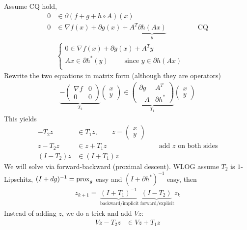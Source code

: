 \documentclass[class=article,crop=false]{standalone}
\begin{document}
Assume CQ hold,
\begin{align*}
	0 &\in \partial (f+g+h \circ A)(x)\\
	0 &\in \nabla f(x)+ \partial g(x) + A^{T} \underbrace{ \partial h(Ax) }_{ y} && \text{ CQ} \\
	  &\begin{cases}
		0 \in \nabla f(x) + \partial g(x) + A^{T}y\\
		Ax \in \partial h^* (y)\qquad  \text{ since } y \in \partial h(Ax) \\
	\end{cases}
\end{align*}
Rewrite the two equations in matrix form (although they are operators)
\begin{align*}
	\underbrace{ - \begin{pmatrix} \nabla f &0\\0&0 \end{pmatrix}}_{T_2} \begin{pmatrix} x\\y \end{pmatrix} \in \underbrace{ \begin{pmatrix} \partial g& A^{T}\\-A& \partial h^*  \end{pmatrix}}_{T_1} \begin{pmatrix} x\\y \end{pmatrix} 
\end{align*}
This yields
\begin{align*}
	- T_2 z &\in T_1 z,\qquad  z = \begin{pmatrix} x\\y \end{pmatrix} \\
	z-T_2 z & \in z+T_1 z &&\text{ add }z \text{ on both sides}  \\
	(I-T_2)z  & \in (I+T_1)z
\end{align*}
We will solve via forward-backward (proximal descent). WLOG assume $ T_2$ is $ 1$-Lipschitz, $ (I + dg)^{-1}=\operatorname{prox}_g$ easy and $ (I + \partial h^* )^{-1}$ easy, then
 \begin{align*}
	 z_{k+1} = \underbrace{ (I + T_1)^{-1} }_{ \text{ backward/implicit} } \underbrace{ (I-T_2) }_{ \text{ forward/explicit} } z_k
\end{align*}
Instead of adding $ z$, we do a trick and add $ Vz$:
\begin{align*}
	Vz-T_2 z &\in Vz+ T_1 z
\end{align*}
\end{document}
